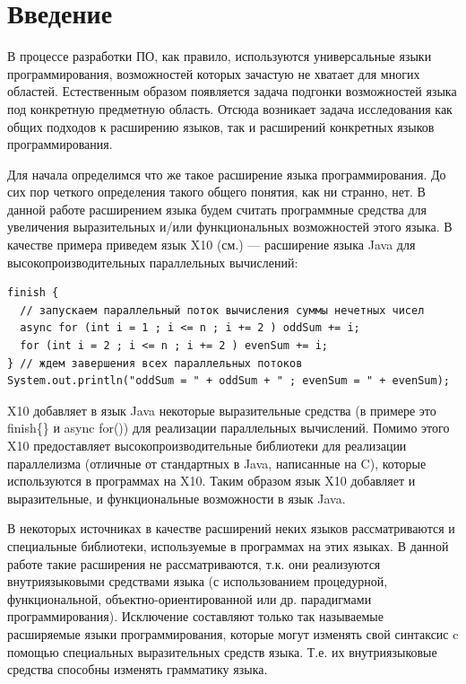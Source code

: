 \documentclass[a4paper,12pt,titlepage]{extarticle}
\begin{document}
\setcounter{page}{3}
\renewcommand{\contentsname}{Оглавление}
\tableofcontents

\pagebreak

\section{Введение}

В процессе разработки ПО, как правило, используются универсальные языки
программирования, возможностей которых зачастую не хватает для многих областей.
Естественным образом появляется задача подгонки возможностей языка под
конкретную предметную область. Отсюда возникает задача исследования как общих
подходов к расширению языков, так и расширений конкретных языков
программирования.

Для начала определимся что же такое расширение языка программирования. До сих
пор четкого определения такого общего понятия, как ни странно, нет. В данной
работе расширением языка будем считать программные средства для увеличения
выразительных и/или функциональных возможностей этого языка. В
качестве примера приведем язык X10 (см.\cite{x10}) --- расширение языка Java для
высокопроизводительных параллельных вычислений:
\begin{verbatim}
finish {
  // запускаем параллельный поток вычисления суммы нечетных чисел
  async for (int i = 1 ; i <= n ; i += 2 ) oddSum += i;
  for (int i = 2 ; i <= n ; i += 2 ) evenSum += i;
} // ждем завершения всех параллельных потоков
System.out.println("oddSum = " + oddSum + " ; evenSum = " + evenSum);
\end{verbatim}
X10 добавляет в язык Java некоторые выразительные средства (в
примере это finish\{\} и async for()) для реализации параллельных вычислений.
Помимо этого X10 предоставляет высокопроизводительные библиотеки для реализации
параллелизма (отличные от стандартных в Java, написанные на C), которые
используются в программах на X10. Таким образом язык X10 добавляет и выразительные, и
функциональные возможности в язык Java.

В некоторых источниках в качестве расширений неких языков рассматриваются и
специальные библиотеки, используемые в программах на этих языках. В данной
работе такие расширения не рассматриваются, т.к. они реализуются внутриязыковыми средствами
языка (с использованием процедурной, функциональной, объектно-ориентированной
или др. парадигмами программирования).
Исключение составляют только так называемые расширяемые языки программирования,
которые могут изменять свой синтаксис c помощью специальных выразительных
средств языка. Т.е. их внутриязыковые средства способны изменять грамматику
языка.
\end{document}
